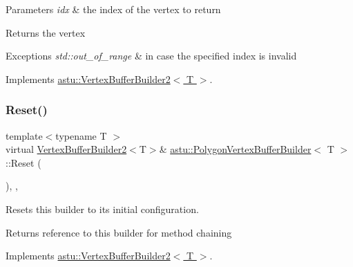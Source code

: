 \begin{DoxyParams}{Parameters}
{\em idx} & the index of the vertex to return\\
\hline
\end{DoxyParams}
\begin{DoxyReturn}{Returns}
the vertex 
\end{DoxyReturn}

\begin{DoxyExceptions}{Exceptions}
{\em std\+::out\+\_\+of\+\_\+range} & in case the specified index is invalid \\
\hline
\end{DoxyExceptions}


Implements \hyperlink{classastu_1_1VertexBufferBuilder2_ae9ecf15e9ddafcdac089ebe61e37a242}{astu\+::\+Vertex\+Buffer\+Builder2$<$ T $>$}.

\mbox{\label{classastu_1_1PolygonVertexBufferBuilder_a1d0b4429c0fefa106f056a6406ba1d89}} 
\subsubsection{\texorpdfstring{Reset()}{Reset()}}
{\footnotesize\ttfamily template$<$typename T $>$ \\
virtual \hyperlink{classastu_1_1VertexBufferBuilder2}{Vertex\+Buffer\+Builder2}$<$T$>$\& \hyperlink{classastu_1_1PolygonVertexBufferBuilder}{astu\+::\+Polygon\+Vertex\+Buffer\+Builder}$<$ T $>$\+::Reset (\begin{DoxyParamCaption}{ }\end{DoxyParamCaption})\hspace{0.3cm}{\ttfamily [inline]}, {\ttfamily [override]}, {\ttfamily [virtual]}}

Resets this builder to its initial configuration.

\begin{DoxyReturn}{Returns}
reference to this builder for method chaining 
\end{DoxyReturn}


Implements \hyperlink{classastu_1_1VertexBufferBuilder2_a13de4c923fb8e44b99f6cd36430dd369}{astu\+::\+Vertex\+Buffer\+Builder2$<$ T $>$}.

\mbox{\label{classastu_1_1PolygonVertexBufferBuilder_a64c4253a91903f0650145dc10c4d356b}} 
